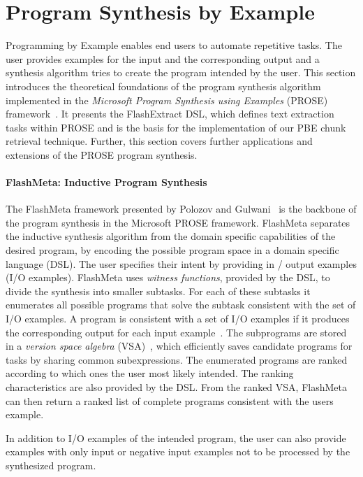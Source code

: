 \documentclass[\myrootdir/main.tex]{subfiles}
\begin{document}
\section{Program Synthesis by Example}
\label{sec:rw-prose}
Programming by Example enables end users to automate repetitive tasks.
The user provides examples for the input and the corresponding output and a synthesis algorithm tries to create the program intended by the user.
This section introduces the theoretical foundations of the program synthesis algorithm implemented in the \emph{Microsoft Program Synthesis using Examples} (PROSE) framework~\cite{prose2019webpage}.
It presents the FlashExtract DSL, which defines text extraction tasks within PROSE and is the basis for the implementation of our PBE chunk retrieval technique.
Further, this section covers further applications and extensions of the PROSE program synthesis.

\paragraph{FlashMeta: Inductive Program Synthesis}
The FlashMeta framework presented by Polozov and Gulwani~\cite{polozov2015flashmeta:} is the backbone of the program synthesis in the Microsoft PROSE framework.
FlashMeta separates the inductive synthesis algorithm from the domain specific capabilities of the desired program, by encoding the possible program space in a domain specific language (DSL).
The user specifies their intent by providing in / output examples (I/O examples).
FlashMeta uses \emph{witness functions}, provided by the DSL, to divide the synthesis into smaller subtasks.
For each of these subtasks it enumerates all possible programs that solve the subtask consistent with the set of I/O examples.
A program is consistent with a set of I/O examples if it produces the corresponding output for each input example~\cite{mitchell1982generalization}.
The subprograms are stored in a \emph{version space algebra} (VSA)~\cite{mitchell1982generalization}, which efficiently saves candidate programs for tasks by sharing common subexpressions.
The enumerated programs are ranked according to which ones the user most likely intended.
The ranking characteristics are also provided by the DSL.
From the ranked VSA, FlashMeta can then return a ranked list of complete programs consistent with the users example.

In addition to I/O examples of the intended program, the user can also provide examples with only input or negative input examples not to be processed by the synthesized program.
\end{document}
